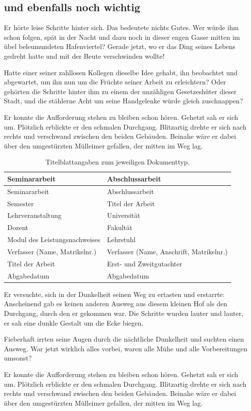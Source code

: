\documentclass[12pt,ngerman,a4paper,DIV=11]{scrartcl}
\begin{document}
\subsection{und ebenfalls noch
wichtig}\label{und-ebenfalls-noch-wichtig}

Er hörte leise Schritte hinter sich. Das bedeutete nichts Gutes. Wer
würde ihm schon folgen, spät in der Nacht und dazu noch in dieser engen
Gasse mitten im übel beleumundeten Hafenviertel? Gerade jetzt, wo er das
Ding seines Lebens gedreht hatte und mit der Beute verschwinden wollte!

Hatte einer seiner zahllosen Kollegen dieselbe Idee gehabt, ihn
beobachtet und abgewartet, um ihn nun um die Früchte seiner Arbeit zu
erleichtern? Oder gehörten die Schritte hinter ihm zu einem der
unzähligen Gesetzeshüter dieser Stadt, und die stählerne Acht um seine
Handgelenke würde gleich zuschnappen?

Er konnte die Aufforderung stehen zu bleiben schon hören. Gehetzt sah er
sich um. Plötzlich erblickte er den schmalen Durchgang. Blitzartig
drehte er sich nach rechts und verschwand zwischen den beiden Gebäuden.
Beinahe wäre er dabei über den umgestürzten Mülleimer gefallen, der
mitten im Weg lag.

\begin{longtable}[c]{@{}ll@{}}
\caption{Titelblattangaben zum jeweiligen Dokumenttyp.}\tabularnewline
\toprule
Seminararbeit & Abschlussarbeit\tabularnewline
\midrule
\endfirsthead
\toprule
Seminararbeit & Abschlussarbeit\tabularnewline
\midrule
\endhead
Semester & Titel der Arbeit\tabularnewline
Lehrveranstaltung & Universität\tabularnewline
Dozent & Fakultät\tabularnewline
Modul des Leistungsnachweises & Lehrstuhl\tabularnewline
Verfasser (Name, Matrikelnr.) & Verfasser (Name, Anschrift,
Matrikelnr.)\tabularnewline
Titel der Arbeit & Erst- und Zweitgutachter\tabularnewline
Abgabedatum & Abgabedatum\tabularnewline
\bottomrule
\end{longtable}

Er versuchte, sich in der Dunkelheit seinen Weg zu ertasten und
erstarrte: Anscheinend gab es keinen anderen Ausweg aus diesem kleinen
Hof als den Durchgang, durch den er gekommen war. Die Schritte wurden
lauter und lauter, er sah eine dunkle Gestalt um die Ecke biegen.

Fieberhaft irrten seine Augen durch die nächtliche Dunkelheit und
suchten einen Ausweg. War jetzt wirklich alles vorbei, waren alle Mühe
und alle Vorbereitungen umsonst?

Er konnte die Aufforderung stehen zu bleiben schon hören. Gehetzt sah er
sich um. Plötzlich erblickte er den schmalen Durchgang. Blitzartig
drehte er sich nach rechts und verschwand zwischen den beiden Gebäuden.
Beinahe wäre er dabei über den umgestürzten Mülleimer gefallen, der
mitten im Weg lag.
\end{document}
